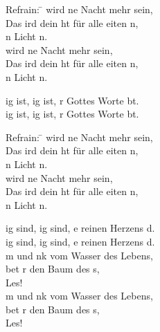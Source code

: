 
\begin{tabbing}
Refrain: \=  wird ne Nacht mehr sein,\\ 
         \>   Das  ird dein ht für alle eiten n, \\
\> n Licht n.\\ 
 \> wird ne Nacht mehr sein,\\ 
         \>   Das  ird dein ht für alle eiten n, \\
         \>   n Licht n. 
\end{tabbing}

ig ist, ig ist, r Gottes Worte bt. \\ 
ig ist, ig ist, r Gottes Worte bt. 

\begin{tabbing}
Refrain: \=  wird ne Nacht mehr sein,\\ 
         \>  Das  ird dein ht für alle eiten n, \\
\> n Licht n.\\ 
\>  wird ne Nacht mehr sein,\\ 
 \>          Das  ird dein ht für alle eiten n, \\
 \> n Licht n. 
\end{tabbing}

ig sind, ig sind, e reinen Herzens d.\\ 
ig sind, ig sind, e reinen Herzens d.\\ 

m und nk vom Wasser des Lebens,\\  
 bet r den Baum des s,\\  
 Les!\\ 
m und nk vom Wasser des Lebens, \\ 
 bet r den Baum des s,\\  
 Les! 


